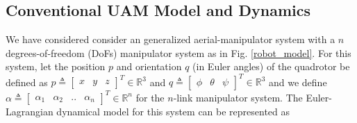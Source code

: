 \documentclass[letterpaper, 10 pt, conference]{ieeeconf}  %
\begin{document}
\subsection{Conventional UAM Model and Dynamics}

We have considered consider an generalized aerial-manipulator system with a $n$ degrees-of-freedom (DoFs) manipulator system as in Fig. \ref{robot_model}. For this system, let the position $p$ and orientation $q$ (in Euler angles) of the quadrotor be defined as $p \triangleq \begin{bmatrix}
	x & y & z
	\end{bmatrix}^T \in \mathbb{R}^{3}$ and  ${q} \triangleq \begin{bmatrix}
	    \phi & \theta & \psi
	\end{bmatrix}^T \in \mathbb{R}^{3}$ and we define ${\alpha} \triangleq \begin{bmatrix}
	    \alpha_1 & \alpha_2 & .. & \alpha_n
	\end{bmatrix}^T \in \mathbb{R}^{n}$ for the $n$-link manipulator system. The Euler-Lagrangian dynamical model for this system can be represented as \cite{arleo2013control}
 
\end{document}

